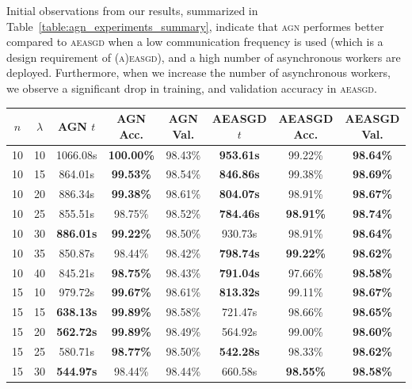 Initial observations from our results, summarized in Table~\ref{table:agn_experiments_summary}, indicate that \textsc{agn} performes better compared to \textsc{aeasgd} when a low communication frequency is used (which is a design requirement of \textsc{(a)easgd}), and a high number of asynchronous workers are deployed. Furthermore, when we increase the number of asynchronous workers, we observe a significant drop in training, and validation accuracy in \textsc{aeasgd}.

\begin{table}[H]
  \centering
  \begin{tabular}{|c|c|c|c|c|c|c|c|}
    \hline
    $n$ & $\lambda$ & \textsc{AGN} $t$ & \textsc{AGN} Acc. & \textsc{AGN} Val. & \textsc{AEASGD} $t$ & \textsc{AEASGD} Acc. & \textsc{AEASGD} Val. \\
    \hline
    \hline
10 & 10 & 1066.08s & \textbf{100.00\%} & 98.43\% & \textbf{953.61s} & 99.22\% & \textbf{98.64\%}  \\
\hline
10 & 15 & 864.01s & \textbf{99.53\%} & 98.54\% & \textbf{846.86s} & 99.38\% & \textbf{98.69\%}  \\
\hline
10 & 20 & 886.34s & \textbf{99.38\%} & 98.61\% & \textbf{804.07s} & 98.91\% & \textbf{98.67\%}  \\
\hline
10 & 25 & 855.51s & 98.75\% & 98.52\% & \textbf{784.46s} & \textbf{98.91\%} & \textbf{98.74\%}  \\
\hline
10 & 30 & \textbf{886.01s} & \textbf{99.22\%} & 98.50\% & 930.73s & 98.91\% & \textbf{98.64\%}  \\
\hline
10 & 35 & 850.87s & 98.44\% & 98.42\% & \textbf{798.74s} & \textbf{99.22\%} & \textbf{98.62\%}  \\
\hline
10 & 40 & 845.21s & \textbf{98.75\%} & 98.43\% & \textbf{791.04s} & 97.66\% & \textbf{98.58\%}  \\
\hline
15 & 10 & 979.72s & \textbf{99.67\%} & 98.61\% & \textbf{813.32s} & 99.11\% & \textbf{98.67\%}  \\
\hline
15 & 15 & \textbf{638.13s} & \textbf{99.89\%} & 98.58\% & 721.47s & 98.66\% & \textbf{98.65\%}  \\
\hline
15 & 20 & \textbf{562.72s} & \textbf{99.89\%} & 98.49\% & 564.92s & 99.00\% & \textbf{98.60\%}  \\
\hline
15 & 25 & 580.71s & \textbf{98.77\%} & 98.50\% & \textbf{542.28s} & 98.33\% & \textbf{98.62\%}  \\
\hline
15 & 30 & \textbf{544.97s} & 98.44\% & 98.44\% & 660.58s & \textbf{98.55\%} & \textbf{98.58\%}  \\

\end{tabular}
\end{table}
